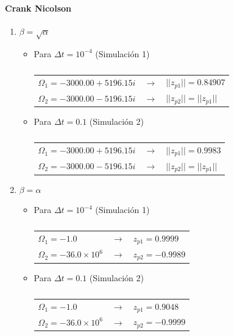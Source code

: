 
\begin{table}[H]

\paragraph{Crank Nicolson}

\begin{enumerate}[label=(\alph*)]
\item $\beta = \sqrt{\alpha}$

\begin{itemize}

\item Para $\Delta t = 10^{-4}$ (Simulación 1)
\begin{center}
\begin{tabular}{lll}
$\Omega_1 = −3000.00 + 5196.15i$ & $\rightarrow$ & $||z_{p1}|| = 0.84907$ \\
$\Omega_2 = −3000.00 - 5196.15i$ & $\rightarrow$ & $||z_{p2}|| = ||z_{p1}||$
\end{tabular}
\end{center}

\item Para $\Delta t = 0.1$ (Simulación 2)
\begin{center}
\begin{tabular}{lll}
$\Omega_1 = −3000.00 + 5196.15i$ & $\rightarrow$ & $||z_{p1}|| = 0.9983$ \\
$\Omega_2 = −3000.00 - 5196.15i$ & $\rightarrow$ & $||z_{p2}|| = ||z_{p1}||$
\end{tabular}
\end{center}

\end{itemize}

\item $\beta = \alpha$

\begin{itemize}

\item Para $\Delta t = 10^{-4}$ (Simulación 1)
\begin{center}
\begin{tabular}{lll}
$\Omega_1 = -1.0$ & $\rightarrow$ & $z_{p1} = 0.9999$ \\
$\Omega_2 = -36.0 \times 10^6$ & $\rightarrow$ & $z_{p2} = -0.9989$
\end{tabular}
\end{center}

\item Para $\Delta t = 0.1$ (Simulación 2)
\begin{center}
\begin{tabular}{lll}
$\Omega_1 = -1.0$ & $\rightarrow$ & $z_{p1} = 0.9048$ \\
$\Omega_2 = -36.0 \times 10^6$ & $\rightarrow$ & $z_{p2} = -0.9999 $
\end{tabular}
\end{center}

\end{itemize}

\end{enumerate}

\caption{} \label{tabla_cn}
\end{table}


